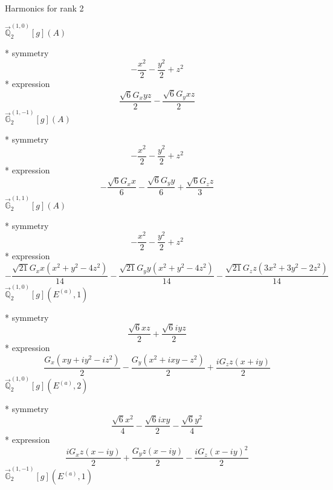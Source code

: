 \documentclass[fleqn,8pt]{jsarticle}
\begin{document}
\noindent * Harmonics for rank 2

\noindent\quad $\vec{\mathbb{Q}}_{2}^{(1,0)}[g](A)$

\noindent\quad ** symmetry
\begin{dmath*}
- \frac{x^{2}}{2} - \frac{y^{2}}{2} + z^{2}
\end{dmath*}
\noindent\quad ** expression
\begin{dmath*}
\frac{\sqrt{6} G_{x} y z}{2} - \frac{\sqrt{6} G_{y} x z}{2}
\end{dmath*}
\noindent\quad $\vec{\mathbb{G}}_{2}^{(1,-1)}[g](A)$

\noindent\quad ** symmetry
\begin{dmath*}
- \frac{x^{2}}{2} - \frac{y^{2}}{2} + z^{2}
\end{dmath*}
\noindent\quad ** expression
\begin{dmath*}
- \frac{\sqrt{6} G_{x} x}{6} - \frac{\sqrt{6} G_{y} y}{6} + \frac{\sqrt{6} G_{z} z}{3}
\end{dmath*}
\noindent\quad $\vec{\mathbb{G}}_{2}^{(1,1)}[g](A)$

\noindent\quad ** symmetry
\begin{dmath*}
- \frac{x^{2}}{2} - \frac{y^{2}}{2} + z^{2}
\end{dmath*}
\noindent\quad ** expression
\begin{dmath*}
- \frac{\sqrt{21} G_{x} x \left(x^{2} + y^{2} - 4 z^{2}\right)}{14} - \frac{\sqrt{21} G_{y} y \left(x^{2} + y^{2} - 4 z^{2}\right)}{14} - \frac{\sqrt{21} G_{z} z \left(3 x^{2} + 3 y^{2} - 2 z^{2}\right)}{14}
\end{dmath*}
\noindent\quad $\vec{\mathbb{Q}}_{2}^{(1,0)}[g](E^{(a)},1)$

\noindent\quad ** symmetry
\begin{dmath*}
\frac{\sqrt{6} x z}{2} + \frac{\sqrt{6} i y z}{2}
\end{dmath*}
\noindent\quad ** expression
\begin{dmath*}
\frac{G_{x} \left(x y + i y^{2} - i z^{2}\right)}{2} - \frac{G_{y} \left(x^{2} + i x y - z^{2}\right)}{2} + \frac{i G_{z} z \left(x + i y\right)}{2}
\end{dmath*}
\noindent\quad $\vec{\mathbb{Q}}_{2}^{(1,0)}[g](E^{(a)},2)$

\noindent\quad ** symmetry
\begin{dmath*}
\frac{\sqrt{6} x^{2}}{4} - \frac{\sqrt{6} i x y}{2} - \frac{\sqrt{6} y^{2}}{4}
\end{dmath*}
\noindent\quad ** expression
\begin{dmath*}
\frac{i G_{x} z \left(x - i y\right)}{2} + \frac{G_{y} z \left(x - i y\right)}{2} - \frac{i G_{z} \left(x - i y\right)^{2}}{2}
\end{dmath*}
\noindent\quad $\vec{\mathbb{G}}_{2}^{(1,-1)}[g](E^{(a)},1)$
\end{document}
